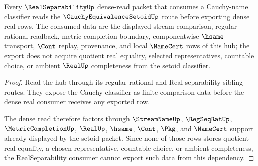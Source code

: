 \begin{theorem}
\label{thm:cauchy-equivalence-setoid-seed-closure}
Every $\RealSeparabilityUp$ dense-read packet that consumes a Cauchy-name classifier reads the $\CauchyEquivalenceSetoidUp$ route before exporting dense real rows. The consumed data are the displayed stream comparison, regular rational readback, metric-completion boundary, componentwise $\hsame$ transport, $\Cont$ replay, provenance, and local $\NameCert$ rows of this hub; the export does not acquire quotient real equality, selected representatives, countable choice, or ambient $\RealUp$ completeness from the setoid classifier.
\end{theorem}
\begin{proof}
Read the hub through its regular-rational and Real-separability sibling routes. They expose the Cauchy classifier as finite comparison data before the dense real consumer receives any exported row.

The dense read therefore factors through $\StreamNameUp$, $\RegSeqRatUp$, $\MetricCompletionUp$, $\RealUp$, $\hsame$, $\Cont$, $\Pkg$, and $\NameCert$ support already displayed by the setoid packet. Since none of those rows stores quotient real equality, a chosen representative, countable choice, or ambient completeness, the RealSeparability consumer cannot export such data from this dependency.
\end{proof}
